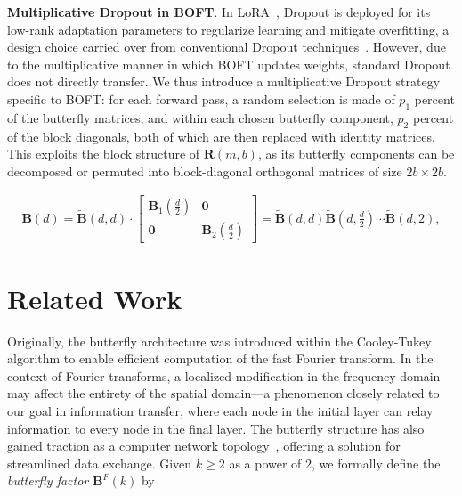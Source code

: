 \textbf{Multiplicative Dropout in BOFT}. In LoRA~\cite{hulora2022}, Dropout is deployed for its low-rank adaptation parameters to regularize learning and mitigate overfitting, a design choice carried over from conventional Dropout techniques~\cite{srivastava2014dropout}. However, due to the multiplicative manner in which BOFT updates weights, standard Dropout does not directly transfer. We thus introduce a multiplicative Dropout strategy specific to BOFT: for each forward pass, a random selection is made of $p_1$ percent of the butterfly matrices, and within each chosen butterfly component, $p_2$ percent of the block diagonals, both of which are then replaced with identity matrices. This exploits the block structure of $\bm{R}(m, b)$, as its butterfly components can be decomposed or permuted into block-diagonal orthogonal matrices of size $2b \times 2b$.

\begin{equation}
\begin{aligned}
    \!\!\bm{B}(d)=\tilde{\bm{B}}(d,d)\!\cdot\!\begin{bmatrix}
    \bm{B}_1(\frac{d}{2})\!\!\!\!\! & \bm{0} \\
    \bm{0}\!\!\!\!\! &\bm{B}_2(\frac{d}{2})
    \end{bmatrix}= \tilde{\bm{B}}(d,d)\tilde{\bm{B}}(d,\frac{d}{2})\cdots\tilde{\bm{B}}(d,2),
\end{aligned}
\end{equation}

\section{Related Work}

Originally, the butterfly architecture was introduced within the Cooley-Tukey algorithm to enable efficient computation of the fast Fourier transform. In the context of Fourier transforms, a localized modification in the frequency domain may affect the entirety of the spatial domain—a phenomenon closely related to our goal in information transfer, where each node in the initial layer can relay information to every node in the final layer. The butterfly structure has also gained traction as a computer network topology~\cite{solihin2015fundamentals,li2011linear}, offering a solution for streamlined data exchange. Given $k \geq 2$ as a power of $2$, we formally define the \emph{butterfly factor} $\bm{B}^F(k)$ by

